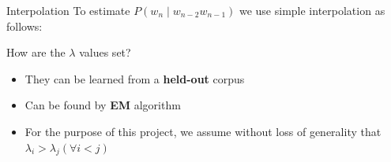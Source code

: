 \documentclass{beamer}
\begin{document}
\begin{frame}{Interpolation}
    To estimate $P(w_n\mid w_{n-2}w_{n-1})$ we use simple interpolation as follows:



\end{frame}

\begin{frame}{How are the $\lambda$ values set?}
    \begin{itemize}
        \item They can be learned from a \textbf{held-out} corpus
        \item Can be found by \textbf{EM} algorithm
        \item For the purpose of this project, we assume without loss of generality that $\lambda_i > \lambda_j (\forall i < j)$
    \end{itemize}
\end{frame}
\end{document}
